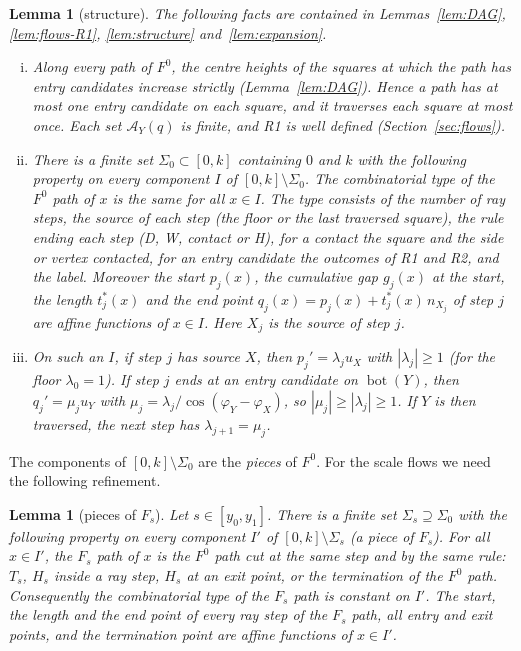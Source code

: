\documentclass[11pt]{amsart}
\newcommand{\Bot}{\operatorname{bot}}
\newcommand{\Fz}{F^{0}}
\newcommand{\Fs}{F_{s}}
\newtheorem{lemma}[theorem]{Lemma}
\theoremstyle{definition}
\theoremstyle{remark}
\numberwithin{equation}{section}
\begin{document}
\begin{lemma}[structure]\label{lem:P4-recall}
The following facts are contained in Lemmas~\ref{lem:DAG}, \ref{lem:flows-R1}, \ref{lem:structure} and~\ref{lem:expansion}.
\begin{enumerate}[(i)]
\item Along every path of $\Fz$, the centre heights of the squares at which the path has entry candidates increase strictly (Lemma~\ref{lem:DAG}). Hence a path has at most one entry candidate on each square, and it traverses each square at most once. Each set $\mathcal A_Y(q)$ is finite, and R1 is well defined (Section~\ref{sec:flows}).
\item There is a finite set $\Sigma_0\subset[0,k]$ containing $0$ and $k$ with the following property on every component $I$ of $[0,k]\setminus\Sigma_0$. The combinatorial type of the $\Fz$ path of $x$ is the same for all $x\in I$. The type consists of the number of ray steps, the source of each step (the floor or the last traversed square), the rule ending each step (D, W, contact or H), for a contact the square and the side or vertex contacted, for an entry candidate the outcomes of R1 and R2, and the label. Moreover the start $p_j(x)$, the cumulative gap $g_j(x)$ at the start, the length $t^*_j(x)$ and the end point $q_j(x)=p_j(x)+t^*_j(x)\,n_{X_j}$ of step $j$ are affine functions of $x\in I$. Here $X_j$ is the source of step $j$.
\item On such an $I$, if step $j$ has source $X$, then $p_j'=\lambda_ju_X$ with $|\lambda_j|\ge1$ (for the floor $\lambda_0=1$). If step $j$ ends at an entry candidate on $\Bot(Y)$, then $q_j'=\mu_ju_Y$ with $\mu_j=\lambda_j/\cos(\varphi_Y-\varphi_X)$, so $|\mu_j|\ge|\lambda_j|\ge1$. If $Y$ is then traversed, the next step has $\lambda_{j+1}=\mu_j$.
\end{enumerate}
\end{lemma}

The components of $[0,k]\setminus\Sigma_0$ are the \emph{pieces} of $\Fz$. For the scale flows we need the following refinement.

\begin{lemma}[pieces of $\Fs$]\label{lem:P4-refine}
Let $s\in[y_0,y_1]$. There is a finite set $\Sigma_s\supseteq\Sigma_0$ with the following property on every component $I'$ of $[0,k]\setminus\Sigma_s$ (a \emph{piece} of $\Fs$). For all $x\in I'$, the $\Fs$ path of $x$ is the $\Fz$ path cut at the same step and by the same rule: $T_s$, $H_s$ inside a ray step, $H_s$ at an exit point, or the termination of the $\Fz$ path. Consequently the combinatorial type of the $\Fs$ path is constant on $I'$. The start, the length and the end point of every ray step of the $\Fs$ path, all entry and exit points, and the termination point are affine functions of $x\in I'$.
\end{lemma}
\end{document}
